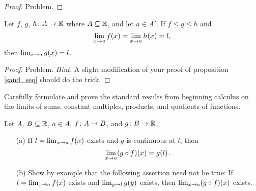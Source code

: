 \begin{proof} Problem.  \ns \end{proof}

\begin{prop}\label{sand_fcn} Let $f$, $g$, $h \colon A \rightarrow \mathbb{R}$ where $A \subseteq \mathbb{R}$, and
let $a \in A'$.  If $f \le g \le h$ and
   \[ \lim_{x \rightarrow a}f(x) = \lim_{x \rightarrow a}h(x) = l, \]
then $\lim_{x \rightarrow a}g(x) = l$.
\end{prop}


\begin{proof} Problem. \emph{Hint.} A slight modification of your proof of proposition
\ref{sand_seq} should do the trick.  \ns
\end{proof}

\begin{prob} Carefully formulate and prove
the standard results from beginning calculus on the limits of sums, constant multiples,
products, and quotients of functions.
\end{prob}

\begin{prob} Let $A$, $B \subseteq \mathbb{R}$, $a \in A$, $f \colon A \rightarrow B$, and $g \colon B \rightarrow \mathbb{R}$.
 \begin{enumerate}
  \item[(a)] If $l = \lim_{x \rightarrow a}f(x)$ exists and $g$ is continuous at $l$, then
    \[ \lim_{x \rightarrow a}(g \circ f)(x) = g(l)\,. \]
  \item[(b)] Show by example that the following assertion need not be true: If
$l = \lim_{x \rightarrow a}f(x)$ exists and $\lim_{y \rightarrow l}g(y)$ exists, then $\lim_{x \rightarrow a}(g
\circ f)(x)$ exists.
 \end{enumerate}
\end{prob}




\endinput
